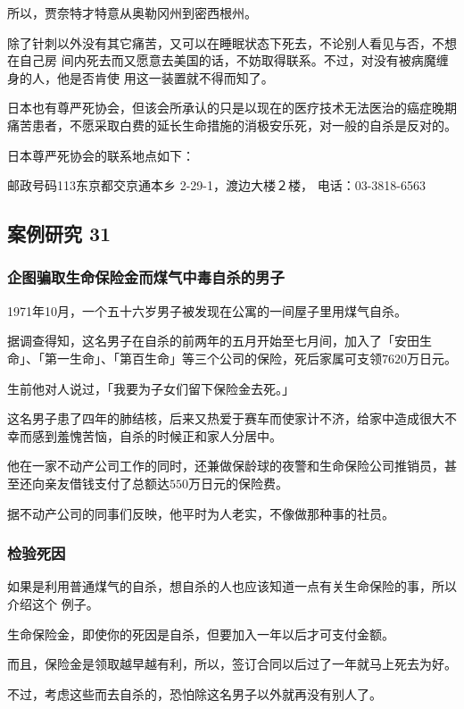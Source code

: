 \documentclass[UTF8]{ctexart}
\begin{document}
所以，贾奈特才特意从奥勒冈州到密西根州。

除了针刺以外没有其它痛苦，又可以在睡眠状态下死去，不论别人看见与否，不想在自己房 间内死去而又愿意去美国的话，不妨取得联系。不过，对没有被病魔缠身的人，他是否肯使 用这一装置就不得而知了。

日本也有尊严死协会，但该会所承认的只是以现在的医疗技术无法医治的癌症晚期痛苦患者，不愿采取白费的延长生命措施的消极安乐死，对一般的自杀是反对的。

日本尊严死协会的联系地点如下：

邮政号码113东京都交京通本乡 2-29-1，渡边大楼２楼，
电话：03-3818-6563


\subsection{案例研究 31}

\subsubsection*{企图骗取生命保险金而煤气中毒自杀的男子}

1971年10月，一个五十六岁男子被发现在公寓的一间屋子里用煤气自杀。

据调查得知，这名男子在自杀的前两年的五月开始至七月间，加入了「安田生命」、「第一生命」、「第百生命」等三个公司的保险，死后家属可支领$7620$万日元。

生前他对人说过，「我要为子女们留下保险金去死。」

这名男子患了四年的肺结核，后来又热爱于赛车而使家计不济，给家中造成很大不幸而感到羞愧苦恼，自杀的时候正和家人分居中。

他在一家不动产公司工作的同时，还兼做保龄球的夜警和生命保险公司推销员，甚至还向亲友借钱支付了总额达$550$万日元的保险费。

据不动产公司的同事们反映，他平时为人老实，不像做那种事的社员。

\subsubsection*{检验死因}

如果是利用普通煤气的自杀，想自杀的人也应该知道一点有关生命保险的事，所以介绍这个
例子。

生命保险金，即使你的死因是自杀，但要加入一年以后才可支付金额。

而且，保险金是领取越早越有利，所以，签订合同以后过了一年就马上死去为好。

不过，考虑这些而去自杀的，恐怕除这名男子以外就再没有别人了。
\end{document}
